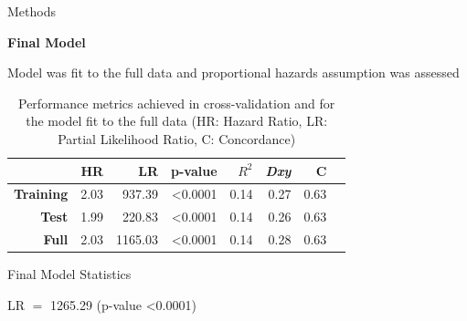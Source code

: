 \documentclass[final]{beamer}
\newlength{\onecolwid}
\begin{document}
\begin{frame}[t]
\begin{columns}[t]
\begin{column}{\onecolwid}
\begin{block}{Methods}
% 
% 

\vspace{1ex}

\textcolor{dblue!70}{} \textcolor{dblue!70}{\textbf{Final Model}} 

\vspace{0.5ex}

Model was fit to the full data and proportional hazards assumption was assessed

\vspace{1.5ex}

\end{block}


% 

\begin{table}[!htbp]
\captionsetup{skip=40pt}
\vspace{3ex}
\begin{tabular}{|r|r|r|r|r|r|r|r|}
  \hline
  & \textbf{HR} & \textbf{LR} & \textbf{p-value} & \textbf{$R^2$} & \textbf{\textit{Dxy}} & \textbf{C} \\
  \hline
  \textbf{Training} & 2.03 & 937.39  & \textless0.0001 & 0.14 & 0.27 & 0.63 \\
  \textbf{Test}     & 1.99 & 220.83  & \textless0.0001 & 0.14 & 0.26 & 0.63 \\
  \textbf{Full}     & 2.03 & 1165.03 & \textless0.0001 & 0.14 & 0.28 & 0.63 \\
  \hline
\end{tabular}
\caption{Performance metrics achieved in cross-validation and for the model fit to the full data (HR: Hazard Ratio, LR: Partial Likelihood Ratio, C: Concordance)}
\label{table:1}
\end{table}

\vspace{2ex}


\begin{block}{Final Model Statistics}

\textcolor{dblue!70}{} LR $=$ 1265.29 (p-value \textless0.0001)


\end{block}
\end{column}
\end{columns}
\end{frame}
\end{document}
